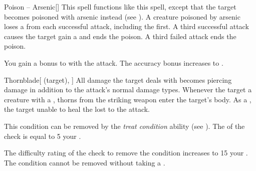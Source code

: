 \lowercase{\hypertarget{spell:Poison -- Arsenic}{}}\label{spell:Poison -- Arsenic}
\begin{freeability}[Rank 3]{\hypertarget{spell:Poison -- Arsenic}{Poison -- Arsenic}}[]
This spell functions like this  spell, except that the target becomes poisoned with arsenic instead (see ).
A creature poisoned by arsenic loses a  from each successful attack, including the first.
A third successful attack causes the target gain a  and ends the poison.
A third failed attack ends the poison.

\rankline
{} You gain a  bonus to  with the attack.
 The accuracy bonus increases to .
\end{freeability}
\vspace{0.25em}



\lowercase{\hypertarget{spell:Thornblade}{}}\label{spell:Thornblade}
\begin{attuneability}[Rank 3]{\hypertarget{spell:Thornblade}{Thornblade}}[ (target), ]
All damage the target deals with  becomes piercing damage in addition to the attack's normal damage types.
Whenever the target  a creature with a , thorns from the striking weapon enter the target's body.
As a , the target unable to heal the  lost to the attack.

This condition can be removed by the \textit{treat condition} ability (see ).
The  of the check is equal to 5 \add your .

\rankline
{} The difficulty rating of the check to remove the condition increases to 15 \add your .
 The condition cannot be removed without taking a .
\end{attuneability}
\vspace{0.25em}



